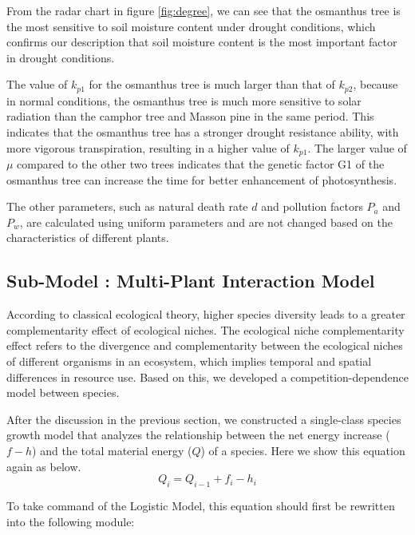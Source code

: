 \documentclass[12pt]{article}  %
\newenvironment{shrinkeq}[1]
{ \bgroup
	\addtolength\abovedisplayshortskip{#1}
	\addtolength\abovedisplayskip{#1}
	\addtolength\belowdisplayshortskip{#1}
	\addtolength\belowdisplayskip{#1}}
{\egroup\ignorespacesafterend}
\begin{document}
From the radar chart in figure \eqref{fig:degree}, we can see that the osmanthus tree is the most sensitive to soil moisture content under drought conditions, which confirms our description that soil moisture content is the most important factor in drought conditions. 

The value of $k_{p1}$ for the osmanthus tree is much larger than that of $k_{p2}$, because in normal conditions, the osmanthus tree is much more sensitive to solar radiation than the camphor tree and Masson pine in the same period. This indicates that the osmanthus tree has a stronger drought resistance ability, with more vigorous transpiration, resulting in a higher value of $k_{p1}$. The larger value of $\mu$ compared to the other two trees indicates that the genetic factor G1 of the osmanthus tree can increase the time for better enhancement of photosynthesis.

The other parameters, such as natural death rate $d$ and pollution factors $P_a$ and $P_w$, are calculated using uniform parameters and are not changed based on the characteristics of different plants.

\subsection{Sub-Model \uppercase\expandafter{}: Multi-Plant Interaction Model}

According to classical ecological theory, higher species diversity leads to a greater complementarity effect of ecological niches. The ecological niche complementarity effect refers to the divergence and complementarity between the ecological niches of different organisms in an ecosystem, which implies temporal and spatial differences in resource use. Based on this, we developed a competition-dependence model between species.

After the discussion in the previous section, we constructed a single-class species growth model that analyzes the relationship between the net energy increase ($f-h$) and the total material energy ($Q$) of a species. Here we show this equation again as below.
\begin{shrinkeq}{-1ex}
	\begin{equation}
    \label{eq:eq31}
	  Q_i=Q_{i-1}+f_i-h_i
	\end{equation}
\end{shrinkeq}

To take command of the Logistic Model, this equation should first be rewritten into the following module:
\end{document}
